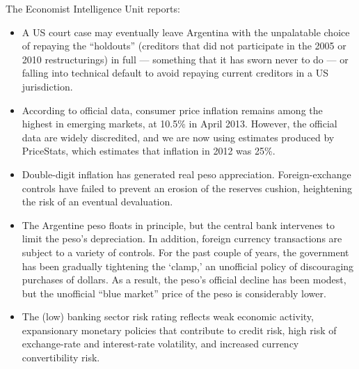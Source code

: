 \documentclass[letterpaper,12pt]{exam}
\begin{document}
\begin{questions}
The Economist Intelligence Unit reports:
\begin{itemize}
\item A US court case may eventually leave
Argentina with the unpalatable choice of repaying the ``holdouts'' (creditors that
did not participate in the 2005 or 2010 restructurings) in full --- something that it
has sworn never to do --- or falling into technical default to avoid repaying
current creditors in a US jurisdiction.

\item According to official data, consumer price inflation remains among the highest
in emerging markets, at 10.5\% in April 2013. However, the official data are
widely discredited, and we are now using estimates produced by PriceStats,
which estimates that inflation in 2012 was 25\%.

\item Double-digit inflation has generated real peso appreciation.
Foreign-exchange controls have failed to prevent an erosion of the reserves cushion,
heightening the risk of an eventual devaluation.

\item The Argentine peso floats in principle, but the central bank intervenes to limit
the peso's depreciation.
In addition, foreign currency transactions are subject to a variety of controls.
For the past couple of years, the government has been gradually tightening the `clamp,'
an unofficial policy of discouraging purchases of dollars.
As a result, the peso's official decline has been modest,
but the unofficial ``blue market'' price of the peso is considerably lower.

\item The (low) banking sector risk rating reflects weak economic activity, expansionary
monetary policies that contribute to credit risk, high risk of exchange-rate
and interest-rate volatility, and increased currency convertibility risk.


\end{itemize}
\end{questions}
\end{document}
